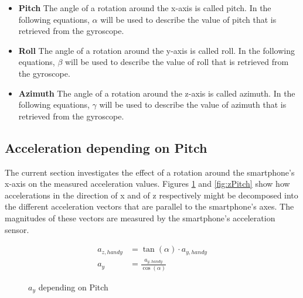 \documentclass[12pt, a4paper, oneside, british]{article}
\begin{document}
\begin{itemize}
\item{
\textbf{Pitch} \newline
The angle of a rotation around the x-axis is called pitch. In the following
equations, $\alpha$ will be used to describe the value of pitch that is
retrieved from the gyroscope.
}
\item{
\textbf{Roll} \newline
The angle of a rotation around the y-axis is called roll. In the following
equations, $\beta$ will be used to describe the value of roll that is retrieved
from the gyroscope.
}
\item{
\textbf{Azimuth} \newline
The angle of a rotation around the z-axis is called azimuth. In the following
equations, $\gamma$ will be used to describe the value of azimuth that is
retrieved from the gyroscope.
}
\end{itemize}


\subsection{Acceleration depending on Pitch}
The current section investigates the effect of a rotation around the
smartphone's x-axis on the measured acceleration values. Figures
\ref{fig:yPitch} and \ref{fig:zPitch} show how accelerations in the direction of
x and of z respectively might be decomposed into the different
acceleration vectors that are parallel to the smartphone's axes. The 
magnitudes of these vectors are measured by the smartphone's acceleration
sensor.

\begin{figure}[htb]
    \centering
    \begin{minipage}{0.5\textwidth}
        \centering
        \captionsetup{justification=centering}
        
        \caption{$a_y$ depending on Pitch}
        \label{fig:yPitch}
    \end{minipage}%
    \hfill
    \begin{minipage}{0.5\textwidth}
        \centering
			\begin{align} 
				a_{z, handy} &= \tan(\alpha) \cdot {a_{y, handy}}\\
				a_y &= \frac{a_{y, handy}}{\cos(\alpha)}
			\end{align}
    \end{minipage}
\end{figure}
\end{document}
